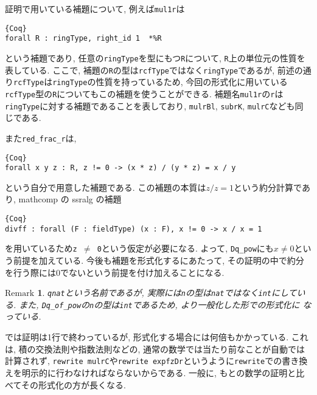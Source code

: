 \documentclass[11pt]{jsreport}
\theoremstyle{mystyle}
\newtheorem{rmk}[df]{$\textrm{Remark}$}
\newcommand{\brmk}{\begin{rmk}}
\newcommand{\ermk}{\end{rmk}}
\newcommand{\0}{\textbf{0}}
\newcommand{\1}{\textbf{1}}
\newcommand{\2}{\textbf{2}}
\begin{document}
証明で用いている補題について, 例えば{\tt mul1r}は
\begin{lstlisting}{Coq}
forall R : ringType, right_id 1  *%R
\end{lstlisting}
という補題であり, 任意の{\tt ringType}を型にもつ{\tt R}について, {\tt R}上の単位元の性質を表している. ここで, 補題の{\tt R}の型は{\tt rcfType}ではなく{\tt ringType}であるが, 前述の通り{\tt rcfType}は{\tt ringType}の性質を持っているため, 今回の形式化に用いている{\tt rcfType}型の{\tt R}についてもこの補題を使うことができる. 補題名{\tt mul1r}の{\tt r}は{\tt ringType}に対する補題であることを表しており, {\tt mulrBl}, {\tt subrK}, {\tt mulrC}なども同じである. 

また{\tt red\_frac\_r}は, 
\begin{lstlisting}{Coq}
forall x y z : R, z != 0 -> (x * z) / (y * z) = x / y \end{lstlisting}
という自分で用意した補題である. この補題の本質は$z / z = 1$という約分計算であり, mathcomp の ssralg の補題
\begin{lstlisting}{Coq}
divff : forall (F : fieldType) (x : F), x != 0 -> x / x = 1 \end{lstlisting}
を用いているため{\tt z $\neq$ 0}という仮定が必要になる. よって, {\tt Dq\_pow}にも{\tt $x \ne 0$}という前提を加えている. 今後も補題を形式化するにあたって, その証明の中で約分を行う際には$0$でないという前提を付け加えることになる. 
\brmk
  {\tt qnat}という名前であるが, 実際には{\tt n}の型は{\tt nat}ではなく{\tt int}にしている. 
  また, {\tt Dq\_of\_pow}の{\tt n}の型は{\tt int}であるため, より一般化した形での形式化に
  なっている. 
\ermk
\cite{Kac}では証明は1行で終わっているが, 形式化する場合には何倍もかかっている. これは, 積の交換法則や指数法則などの, 通常の数学では当たり前なことが自動では計算されず, {\tt rewrite mulrC}や{\tt rewrite expfzDr}というように{\tt rewrite}での書き換えを明示的に行わなければならないからである. 一般に, もとの数学の証明と比べてその形式化の方が長くなる. 
\end{document}
